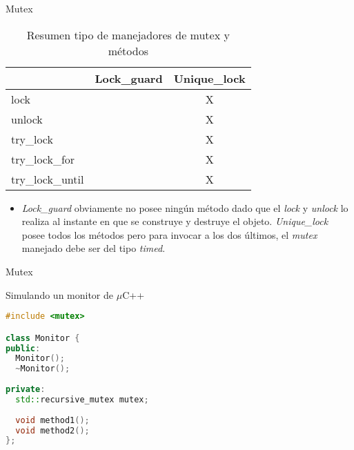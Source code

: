 \begin{frame}{Mutex}
\begin{table}[h]\footnotesize
\centering
\caption{Resumen tipo de manejadores de mutex y métodos}
\label{my-label}
\begin{tabular}{|l|c|c|}
\hline
\rowcolor[HTML]{ECF4FF} 
\multicolumn{1}{|c|}{\cellcolor[HTML]{ECF4FF}{\bf Método}} & {\bf Lock\_guard} & {\bf Unique\_lock} \\ \hline
\rowcolor[HTML]{EFEFEF} 
lock                                                       &                   & X                  \\ \hline
\rowcolor[HTML]{EFEFEF} 
unlock                                                     &                   & X                  \\ \hline
\rowcolor[HTML]{EFEFEF} 
try\_lock                                                  &                   & X                  \\ \hline
\rowcolor[HTML]{CBCEFB} 
try\_lock\_for                                             &                   & X                  \\ \hline
\rowcolor[HTML]{CBCEFB} 
try\_lock\_until                                           &                   & X                  \\ \hline
\end{tabular}
\end{table}
\begin{itemize}
  \item \textit{Lock\_guard} obviamente no posee ningún método dado que el \textit{lock} y \textit{unlock} lo realiza al instante en que se construye y destruye el objeto. \textit{Unique\_lock} posee todos los métodos pero para invocar a los dos últimos, el \textit{mutex} manejado debe ser del tipo \textit{timed}.
\end{itemize}
\end{frame}
\begin{frame}[fragile]{Mutex}
\begin{block}{Simulando un monitor de $\mu$C++}
\begin{lstlisting}[language=C++, basicstyle=\small]
#include <mutex>

class Monitor {
public:
  Monitor();
  ~Monitor();
  
private:
  std::recursive_mutex mutex;
  
  void method1();
  void method2();  
};
\end{lstlisting}
\end{block}
\end{frame}

